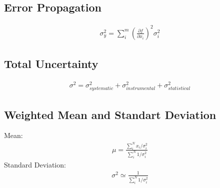 \documentclass[reprint,amsmath,aps,nofootinbib,english]{revtex4-2}
\begin{document}
\subsection{Error Propagation}
\begin{align}
  \sigma^2_y = \sum_i^m \left(\frac{\partial f}{\partial x_i}\right)^2 \sigma^2_i \label{eq:err}
\end{align}

\subsection{Total Uncertainty}
\begin{align}
  \sigma^2 = \sigma_{systematic}^2 + \sigma_{instrumental}^2 + \sigma_{statistical}^2 \label{eq:unc}
\end{align}

\subsection{Weighted Mean and Standart Deviation} 
Mean:
\begin{align}
\mu = \frac{\sum\limits_i^N x_i / \sigma_i^2}{\sum\limits_i^N 1/\sigma_i^2} \label{eq:mean}
\end{align}
Standard Deviation:
\begin{align}
  \sigma^2 \simeq \frac{1}{\sum\limits_i^N 1/\sigma_i^2}  \label{eq:meanstd}
\end{align}


\newpage
\nocite{*}

\end{document}
